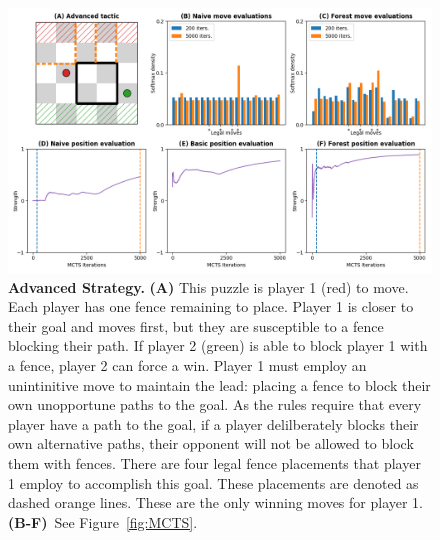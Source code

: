 \documentclass[10pt]{article}
\begin{document}
\begin{figure}[H]
    \centering
    \includegraphics[width=\linewidth]{Adv_tactic.png}
    \caption{\textbf{Advanced Strategy.} \textbf{(A)} This puzzle is player 1 (red) to move. Each player has one fence remaining to place. Player 1 is closer to their goal and moves first, but they are susceptible to a fence blocking their path. If player 2 (green) is able to block player 1 with a fence, player 2 can force a win. Player 1 must employ an unintinitive move to maintain the lead: placing a fence to block their own unopportune paths to the goal. As the rules require that every player have a path to the goal, if a player delilberately blocks their own alternative paths, their opponent will not be allowed to block them with fences. There are four legal fence placements that player 1 employ to accomplish this goal. These placements are denoted as dashed orange lines. These are the only winning moves for player 1. \textbf{(B-F)}~See Figure~\ref{fig:MCTS}.}
    \label{fig:AdvTactic}
\end{figure}


% 
% 
\end{document}
